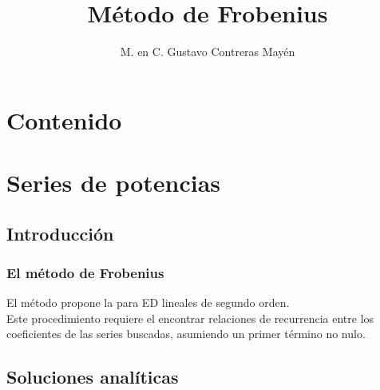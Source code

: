 \documentclass[12pt]{beamer}
\title{\large{Método de Frobenius}}
\author{M. en C. Gustavo Contreras Mayén}
\begin{document}
\maketitle
\fontsize{14}{14}\selectfont
{}

\section*{Contenido}

\section{Series de potencias}
\subsection{Introducción}

\begin{frame}
\frametitle{El método de Frobenius}
El método propone la  para ED lineales de segundo orden.
\\
\bigskip
\pause
Este procedimiento requiere el encontrar relaciones de recurrencia entre los coeficientes de las series buscadas, asumiendo un primer término no nulo.
\end{frame}

\subsection{Soluciones analíticas}
\end{document}
